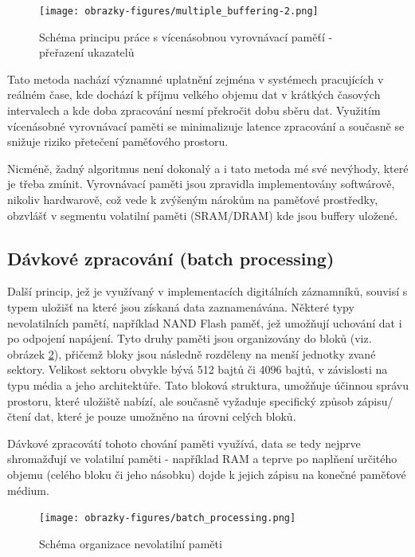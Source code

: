 \begin{figure}[h]
    \centering
    \texttt{[image: obrazky-figures/multiple\_buffering-2.png]}
    
    \caption{Schéma principu práce s vícenásobnou vyrovnávací paměťí - přeřazení ukazatelů}
    \label{fig:multiple-buffering-2}
\end{figure}

Tato metoda nachází významné uplatnění zejména v systémech pracujících v reálném čase, kde dochází k příjmu velkého objemu dat v krátkých časových intervalech a kde doba 
zpracování nesmí překročit dobu sběru dat. Využitím vícenásobné vyrovnávací paměti se minimalizuje latence zpracování a současně se snižuje riziko přetečení paměťového 
prostoru.

Nicméně, žadný algoritmus není dokonalý a i tato metoda mé své nevýhody, které je třeba zmínit. Vyrovnávací paměti jsou zpravidla implementovány softwárově, nikoliv 
hardwarově, což vede k zvýšeným nárokům na paměťové prostředky, obzvlášť v segmentu volatilní paměti (SRAM/DRAM) kde jsou buffery uložené. \cite{basics_of_digital_forensics}

\subsection{Dávkové zpracování (batch processing)}
Další princip, jež je využívaný v implementacích digitálních záznamníků, souvisí s typem uložišť na které jsou získaná data zaznamenávána. Některé typy nevolatilních 
pamětí, například NAND Flash paměť, jež umožňují uchování dat i po odpojení napájení. Tyto druhy paměti jsou organizovány do bloků (viz. obrázek \ref{fig:batch-processing}), 
přičemž bloky jsou následně rozděleny na menší jednotky zvané sektory. Velikost sektoru obvykle bývá 512 bajtů či 4096 bajtů, v závislosti na typu média a jeho 
architektůře. Tato bloková struktura, umožňuje účinnou správu prostoru, které uložiště nabízí, ale současně vyžaduje specifický způsob zápisu/čtení dat, které je pouze 
umožněno na úrovni celých bloků.  \cite{tech_target_nand_flash}

Dávkové zpracovátí tohoto chování paměti využívá, data se tedy nejprve shromažďují ve volatilní paměti - například RAM a teprve po naplňení určitého objemu (celého bloku či 
jeho násobku) dojde k jejich zápisu na konečné paměťové médium.

\begin{figure}[h]
    \centering
    \texttt{[image: obrazky-figures/batch\_processing.png]}
    
    \caption{Schéma organizace nevolatilní paměti}
    \label{fig:batch-processing}
\end{figure}



